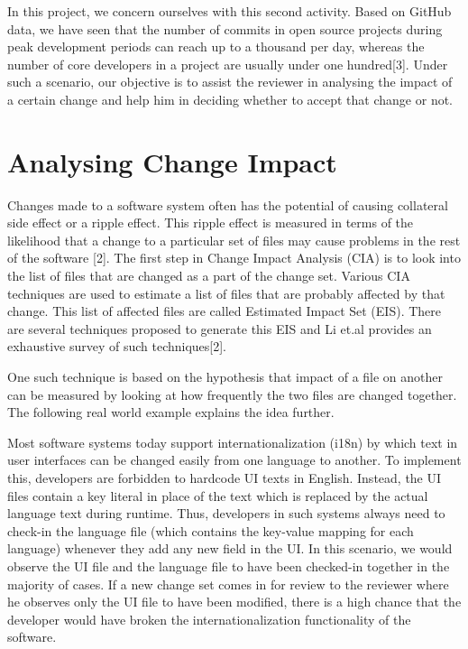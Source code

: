 In this project, we concern ourselves with this second activity. Based on GitHub data, we have seen that the number of commits in open source projects during peak development periods can reach up to a thousand per day, whereas the number of core developers in a project are usually under one hundred[3]. Under such a scenario, our objective is to assist the reviewer in analysing the impact of a certain change and help him in deciding whether to accept that change or not.\\

\section{Analysing Change Impact}

Changes made to a software system often has the potential of causing collateral side effect or a ripple effect. This ripple effect is measured in terms of the likelihood that a change to a particular set of files may cause problems in the rest of the software [2]. The first step in Change Impact Analysis (CIA) is to look into the list of files that are changed as a part of the change set. Various CIA techniques are used to estimate a list of files that are probably affected by that change. This list of affected files are called Estimated Impact Set (EIS). There are several techniques proposed to generate this EIS and Li et.al provides an exhaustive survey of such techniques[2].

One such technique is based on the hypothesis that impact of a file on another can be measured by looking at how frequently the two files are changed together. The following real world example explains the idea further.

Most software systems today support internationalization (i18n) by which text in user interfaces can be changed easily from one language to another. To implement this, developers are forbidden to hardcode UI texts in English. Instead, the UI files contain a key literal in place of the text which is replaced by the actual language text during runtime. Thus, developers in such systems always need to check-in the language file (which contains the key-value mapping for each language) whenever they add any new field in the UI. In this scenario, we would observe the UI file and the language file to have been checked-in together in the majority of cases. If a new change set comes in for review to the reviewer where he observes only the UI file to have been modified, there is a high chance that the developer would have broken the internationalization functionality of the software.

